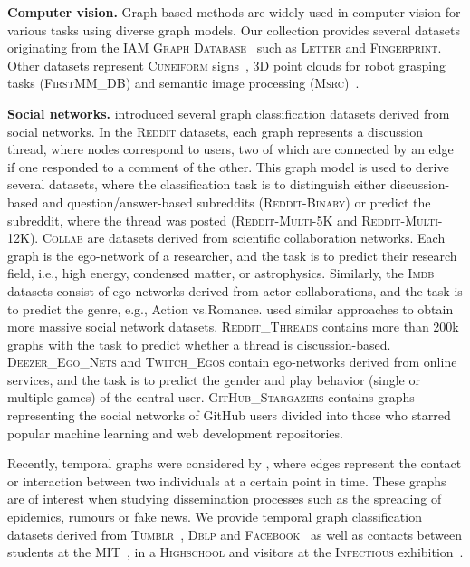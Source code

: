 \documentclass{article}
\newcommand{\xhdr}[1]{{\noindent\bfseries #1}}
\theoremstyle{definition}
\begin{document}
\xhdr{Computer vision.}
Graph-based methods are widely used in computer vision for various tasks using diverse graph models. Our collection provides several datasets originating from the \textsc{IAM Graph Database}~\citep{Riesen2008} such as \textsc{Letter} and \textsc{Fingerprint}. Other datasets represent \textsc{Cuneiform} signs~\citep{Kriege2018}, 3D point clouds for robot grasping tasks (\textsc{FirstMM\_DB}) and semantic image processing (\textsc{Msrc})~\cite{Neu+2016}.

\xhdr{Social networks.}
\citet{Yan+2015a} introduced several graph classification datasets derived from social networks. In the \textsc{Reddit} datasets, each graph represents a discussion thread, where nodes correspond to users, two of which are connected by an edge if one responded to a comment of the other. This graph model is used to derive several datasets, where the classification task is to distinguish either discussion-based and question/answer-based subreddits (\textsc{Reddit-Binary}) or predict the subreddit, where the thread was posted (\textsc{Reddit-Multi-5K} and \textsc{Reddit-Multi-12K}). \textsc{Collab} are datasets derived from scientific collaboration networks. Each graph is the ego-network of a researcher, and the task is to predict their research field, i.e., high energy, condensed matter, or astrophysics. Similarly, the \textsc{Imdb} datasets consist of ego-networks derived from actor collaborations, and the task is to predict the genre, e.g.,  Action vs.\@ Romance.
\citet{Rozemberczki2020} used similar approaches to obtain more massive social network datasets. \textsc{Reddit\_Threads} contains more than 200k graphs with the task to predict whether a thread is discussion-based. \textsc{Deezer\_Ego\_Nets} and \textsc{Twitch\_Egos} contain ego-networks derived from online services, and the task is to predict the gender and play behavior (single or multiple games) of the central user.
\textsc{GitHub\_Stargazers} contains graphs representing the social networks of GitHub users divided into those who starred popular machine learning and web development repositories.


Recently, temporal graphs were considered by \citet{Oettershagen2019}, where edges represent the contact or interaction between two individuals at a certain point in time. These graphs are of interest when studying dissemination processes such as the spreading of epidemics, rumours or fake news. We provide temporal graph classification datasets derived from \textsc{Tumblr}~\citep{rozenshtein2016reconstructing}, \textsc{Dblp} and \textsc{Facebook}~\citep{viswanath2009evolution} as well as contacts between students at the \textsc{MIT}~\cite{konect:eagle06}, in a \textsc{Highschool} and visitors at the \textsc{Infectious} exhibition~\citep{Isella2011}.
\end{document}
